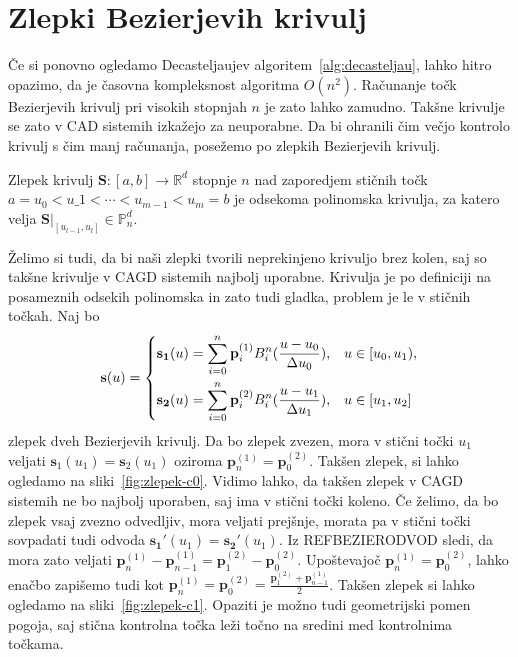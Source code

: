 \documentclass[isrm2, tisk]{fmfdelo}
\newcommand{\R}{\mathbb R}
\newcommand{\Pn}{\mathbb P_n}
\newcommand{\p}{\mathbf{p}}
\begin{document}
    \section{Zlepki Bezierjevih krivulj}
    Če si ponovno ogledamo Decasteljaujev algoritem~\ref{alg:decasteljau}, lahko hitro opazimo, da je časovna kompleksnost algoritma $O(n^2)$.
    Računanje točk Bezierjevih krivulj pri visokih stopnjah $n$ je zato lahko zamudno.
    Takšne krivulje se zato v CAD sistemih izkažejo za neuporabne.
    Da bi ohranili čim večjo kontrolo krivulj s čim manj računanja, posežemo po zlepkih Bezierjevih krivulj.
    \begin{definicija}
        Zlepek krivulj  $\mathbf{S}:[a,b]\to \R^d$ stopnje $n$ nad zaporedjem stičnih točk $a=u_0 < u\_1 < \cdots < u_{m-1} < u_m = b$
        je odsekoma polinomska krivulja, za katero velja $\mathbf{S}|_{[u_{l-1},u_l]} \in \Pn^d$.
    \end{definicija}
    Želimo si tudi, da bi naši zlepki tvorili neprekinjeno krivuljo brez kolen, saj so takšne krivulje v CAGD sistemih najbolj uporabne.
    Krivulja je po definiciji na posameznih odsekih polinomska in zato tudi gladka, problem je le v stičnih točkah.
    Naj bo
    \[\mathbf{s}(u) = \begin{dcases}
                          \mathbf{s_1}(u) = \sum_{i=0}^n \p_i^{(1)}B_i^n(\frac{u-u_0}{\Delta u_0}), & u \in [u_0,u_1),  \\
                          \mathbf{s_2}(u) = \sum_{i=0}^n \p_i^{(2)}B_i^n(\frac{u-u_1}{\Delta u_1}), & u \in [u_1,u_2]
    \end{dcases}\]
    zlepek dveh Bezierjevih krivulj.
    Da bo zlepek zvezen, mora v stični točki $u_1$ veljati $\mathbf{s}_1(u_1) = \mathbf{s}_2(u_1)$ oziroma $\p_n^{(1)} = \p_0^{(2)}$.
    Takšen zlepek, si lahko ogledamo na sliki~\ref{fig:zlepek-c0}.
    Vidimo lahko, da takšen zlepek v CAGD sistemih ne bo najbolj uporaben, saj ima v stični točki koleno.
    Če želimo, da bo zlepek vsaj zvezno odvedljiv, mora veljati prejšnje, morata pa v stični točki sovpadati tudi odvoda $\mathbf{s_1}'(u_1) = \mathbf{s_2}'(u_1)$.
    Iz REFBEZIERODVOD sledi, da mora zato veljati $\p_{n}^{(1)} - \p_{n-1}^{(1)} = \p_{1}^{(2)} - \p_{0}^{(2)}$.
    Upoštevajoč $\p_n^{(1)} = \p_0^{(2)}$, lahko enačbo zapišemo tudi kot $\p_{n}^{(1)} =  \p_{0}^{(2)}  = \frac{\p_{1}^{(2)}+ \p_{n-1}^{(1)}}{2}$.
    Takšen zlepek si lahko ogledamo na sliki~\ref{fig:zlepek-c1}.
    Opaziti je možno tudi geometrijski pomen pogoja, saj stična kontrolna točka leži točno na sredini med kontrolnima točkama.
\end{document}
